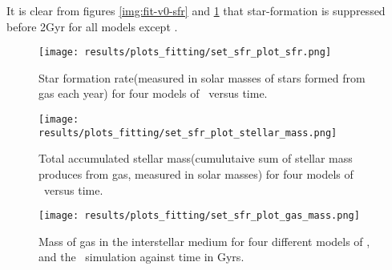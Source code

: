 It is clear from figures \ref{img:fit-v0-sfr} and \ref{img:fit-v0-stellarmass} that star-formation is suppressed before 2Gyr for all models except \vanillaomega.

\begin{figure}[h]
  \begin{minipage}[t][][t]{0.49\textwidth}
    \centering
    \texttt{[image: results/plots\_fitting/set\_sfr\_plot\_sfr.png]}
    \caption[Star formation rate in \omegamodel\ for \insertion-fitting]{\label{img:fit-v0-sfr}
      Star formation rate(measured in solar masses of stars formed from gas each year) for four models of \omegamodel\ versus time. 
    }
  \end{minipage}
  \begin{minipage}[t][][t]{0.49\textwidth}
    \centering
    \texttt{[image: results/plots\_fitting/set\_sfr\_plot\_stellar\_mass.png]}
    \caption[Stellar mass in \omegamodel\ for \insertion-fitting]{\label{img:fit-v0-stellarmass}
      Total accumulated stellar mass(cumulutaive sum of stellar mass produces from gas, measured in solar masses) for four models of \omegamodel\ versus time.
    }
  \end{minipage}
\end{figure}
\begin{figure}[h]
  \centering
  \texttt{[image: results/plots\_fitting/set\_sfr\_plot\_gas\_mass.png]}
  \caption[Gas mass in \omegamodel for \insertion-fitting]{\label{img:fit-v0-gasmass}
    Mass of gas in the interstellar medium for four different models of \omegamodel, and the \eris\ simulation against time in Gyrs.
  }
\end{figure}

